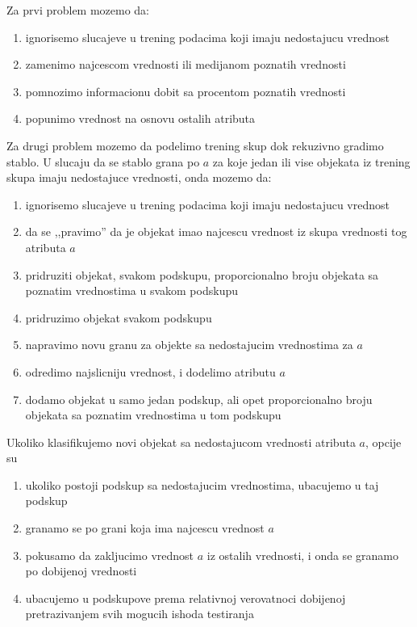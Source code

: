 \documentclass[a4paper]{article}
\begin{document}
Za prvi problem mozemo da:
\begin{enumerate}
    \item ignorisemo slucajeve u trening podacima koji imaju nedostajucu vrednost
    \item zamenimo najcescom vrednosti ili medijanom poznatih vrednosti
    \item pomnozimo informacionu dobit sa procentom poznatih vrednosti
    \item popunimo vrednost na osnovu ostalih atributa
\end{enumerate}

Za drugi problem mozemo da podelimo trening skup dok rekuzivno gradimo stablo. U slucaju da se
stablo grana po \(a\) za koje jedan ili vise objekata iz trening skupa imaju nedostajuce vrednosti,
onda mozemo da:
\begin{enumerate}
    \item ignorisemo slucajeve u trening podacima koji imaju nedostajucu vrednost
    \item da se ,,pravimo'' da je objekat imao najcescu vrednost iz skupa vrednosti tog atributa
        \(a\)
    \item pridruziti objekat, svakom podskupu, proporcionalno broju objekata sa poznatim vrednostima
        u svakom podskupu
    \item pridruzimo objekat svakom podskupu
    \item napravimo novu granu za objekte sa nedostajucim vrednostima za \(a\)
    \item odredimo najslicniju vrednost, i dodelimo atributu \(a\)
    \item dodamo objekat u samo jedan podskup, ali opet proporcionalno broju objekata sa poznatim
        vrednostima u tom podskupu
\end{enumerate}

Ukoliko klasifikujemo novi objekat sa nedostajucom vrednosti atributa \(a\), opcije su
\begin{enumerate}
    \item ukoliko postoji podskup sa nedostajucim vrednostima, ubacujemo u taj podskup
    \item granamo se po grani koja ima najcescu vrednost \(a\)
    \item pokusamo da zakljucimo vrednost \(a\) iz ostalih vrednosti, i onda se granamo po dobijenoj
        vrednosti
    \item ubacujemo u podskupove prema relativnoj verovatnoci dobijenoj pretrazivanjem svih mogucih
        ishoda testiranja
\end{enumerate}
\end{document}
